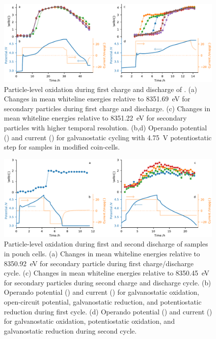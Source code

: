 \documentclass{article}
\begin{document}
\begin{figure}
  \includegraphics{figures/NMC333-particle-echem.pdf}
  \caption{Particle-level oxidation during first charge and discharge
    of \nmc[333]{}. (a) Changes in mean whiteline energies relative to
    \SI{8351.69}{eV} for secondary particles during first charge and
    discharge. (c) Changes in mean whiteline energies relative to
    \SI{8351.22}{eV} for secondary particles with higher temporal
    resolution. (b,d) Operando potential (\textcolor{C0}{\mplline{}})
    and current (\textcolor{C1}{\mplline{}}) for galvanostatic cycling
    with \SI{4.75}{V} potentiostatic step for \nmc[333]{} samples in
    modified coin-cells.}
  \label{fig:nmc333-particles}
\end{figure}

\begin{figure}
  \includegraphics{figures/NCA-particle-echem.pdf}
  \caption{Particle-level oxidation during first and second discharge
    of \nca{} samples in pouch cells. (a) Changes in mean whiteline
    energies relative to \SI{8350.92}{eV} for secondary particle
    during first charge/discharge cycle. (c) Changes in mean whiteline
    energies relative to \SI{8350.45}{eV} for secondary particles
    during second charge and discharge cycle. (b) Operando potential
    (\textcolor{C0}{\mplline{}}) and current
    (\textcolor{C1}{\mplline{}}) for galvanostatic oxidation,
    open-circuit potential, galvanostatic reduction, and
    potentiostatic reduction during first cycle. (d) Operando
    potential (\textcolor{C0}{\mplline{}}) and current
    (\textcolor{C1}{\mplline{}}) for galvanostatic oxidation,
    potentiostatic oxidation, and galvanostatic reduction during
    second cycle.}
  \label{fig:nca-particles}
\end{figure}
\end{document}
